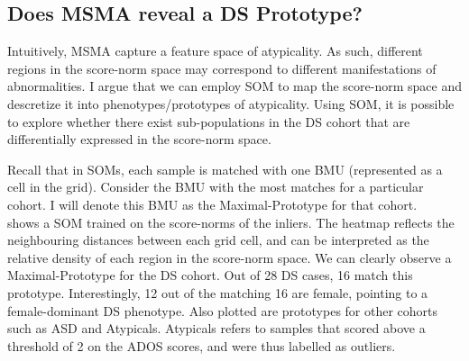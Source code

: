 
\subsection*{Does MSMA reveal a DS Prototype?}


Intuitively, MSMA capture a feature space of atypicality. As such, different regions in the score-norm space may correspond to different manifestations of abnormalities. I argue that we can employ SOM to map the score-norm space and descretize it into phenotypes/prototypes of atypicality. Using SOM, it is possible to explore whether there exist sub-populations in the DS cohort that are differentially expressed in the score-norm space. 

Recall that in SOMs, each sample is matched with one BMU (represented as a cell in the grid). Consider the BMU with the most matches for a particular cohort. I will denote this BMU as the Maximal-Prototype for that cohort. ~ shows a SOM trained on the score-norms of the inliers. The heatmap reflects the neighbouring distances between each grid cell, and can be interpreted as the relative density of each region in the score-norm space.  We can clearly observe a Maximal-Prototype for the DS cohort. Out of 28 DS cases, 16 match this prototype. Interestingly, 12 out of the matching 16 are female, pointing to a female-dominant DS phenotype. Also plotted are prototypes for other cohorts such as ASD and Atypicals. Atypicals refers to samples that scored above a threshold of 2 on the ADOS scores, and were thus labelled as outliers.

